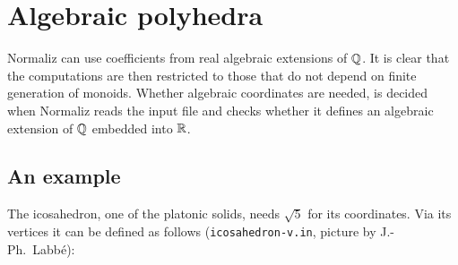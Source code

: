 
\section{Algebraic polyhedra}\label{Algebraic}

Normaliz can use coefficients from real algebraic extensions of ${\mathbb Q}$. It is clear that the computations are then restricted to those that do not depend on finite generation of monoids. Whether algebraic coordinates are needed, is decided when Normaliz reads the input file and checks whether it defines an algebraic extension of ${\mathbb Q}$ embedded into ${\mathbb R}$.

\subsection{An example}\label{alg_ex}

The icosahedron, one of the platonic solids, needs $\sqrt 5$ for its coordinates. Via its vertices it can be defined as follows (\verb|icosahedron-v.in|, picture by J.-Ph.~Labbé):

